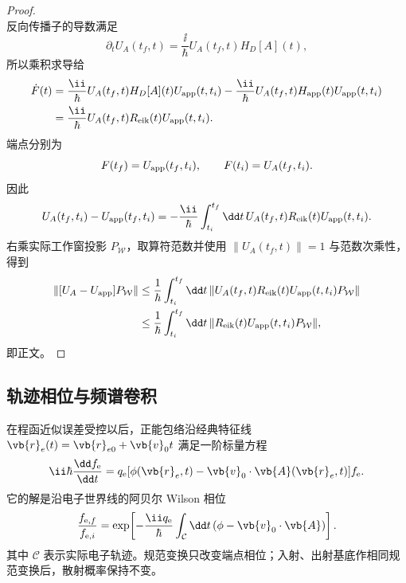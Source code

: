 \begin{proof}
\[\]
反向传播子的导数满足
\[
\partial_tU_A(t_f,t)=\frac{\ii}{\hbar}U_A(t_f,t)H_D[A](t),
\]
所以乘积求导给
\begin{align*}
\dot F(t)
&=\frac{\ii}{\hbar}U_A(t_f,t)H_D[A](t)U_{\rm app}(t,t_i)
-\frac{\ii}{\hbar}U_A(t_f,t)H_{\rm app}(t)U_{\rm app}(t,t_i)\\
&=\frac{\ii}{\hbar}U_A(t_f,t)R_{\rm eik}(t)U_{\rm app}(t,t_i).
\end{align*}
端点分别为
\[
F(t_f)=U_{\rm app}(t_f,t_i),
\qquad
F(t_i)=U_A(t_f,t_i).
\]
因此
\[
U_A(t_f,t_i)-U_{\rm app}(t_f,t_i)
=-\frac{\ii}{\hbar}\int_{t_i}^{t_f}\dd t\,
U_A(t_f,t)R_{\rm eik}(t)U_{\rm app}(t,t_i).
\]
右乘实际工作窗投影 $P_{\mathcal W}$，取算符范数并使用
$\|U_A(t_f,t)\|=1$ 与范数次乘性，得到
\begin{align*}
\|[U_A-U_{\rm app}]P_{\mathcal W}\|
&\le\frac1\hbar\int_{t_i}^{t_f}\dd t\,
\|U_A(t_f,t)R_{\rm eik}(t)U_{\rm app}(t,t_i)P_{\mathcal W}\|\\
&\le\frac1\hbar\int_{t_i}^{t_f}\dd t\,
\|R_{\rm eik}(t)U_{\rm app}(t,t_i)P_{\mathcal W}\|,
\end{align*}
即正文。
\end{proof}


\subsection{轨迹相位与频谱卷积}

在程函近似误差受控以后，正能包络沿经典特征线 $\vb{r}_e(t)=\vb{r}_{e0}+\vb{v}_0t$ 满足一阶标量方程
\begin{equation}
{
\ii\hbar\frac{\dd f_{\mathrm e}}{\dd t}
=q_{\mathrm e}[\phi(\vb{r}_e,t)-\vb{v}_0\cdot\vb{A}(\vb{r}_e,t)]f_{\mathrm e}.}
\label{eq:general_gauge_covariant_eikonal}
\end{equation}
它的解是沿电子世界线的阿贝尔 Wilson 相位
\begin{equation}
{
\frac{f_{\mathrm e,f}}{f_{\mathrm e,i}}
=\exp\!\left[-\frac{\ii q_{\mathrm e}}{\hbar}
\int_{\mathcal C}\dd t\,(\phi-\vb{v}_0\cdot\vb{A})\right].}
\label{eq:general_eikonal_wilson_phase}
\end{equation}
其中 $\mathcal C$ 表示实际电子轨迹。规范变换只改变端点相位；入射、出射基底作相同规范变换后，散射概率保持不变。

